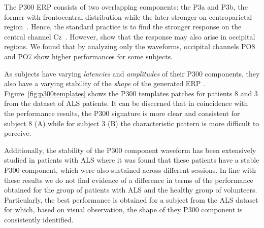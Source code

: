 \documentclass[utf8]{frontiersSCNS} %
\providecommand{\DIFaddtex}[1]{{\protect\color{blue}\uwave{#1}}} %
\providecommand{\DIFaddbegin}{} %
\providecommand{\DIFaddend}{} %
\providecommand{\DIFadd}[1]{\texorpdfstring{\DIFaddtex{#1}}{#1}} %
\begin{document}
\DIFaddend %

The P300 ERP  consists of two overlapping components: the P3a and P3b, the former with frontocentral distribution while the later stronger on centroparietal region~\citep{Polich2007}. Hence, the standard practice is to find the stronger response on the central channel Cz~\citep{Riccio2013}. However, \cite{Krusienski2006} show that the response may also arise in occipital regions.  We found that by analyzing only the waveforms, occipital channels PO8 and PO7 show higher performances for some subjects. 


As subjects have varying \textit{latencies} and \textit{amplitudes} of their P300 components, they also have a varying stability of the \textit{shape} of the generated ERP \citep{Nam2010}.  Figure~\ref{fig:p300templates} shows the \DIFaddbegin \DIFadd{ten sample }\DIFaddend P300 templates patches for patients 8 and 3 from the dataset of ALS patients. It can be discerned that in coincidence with the performance results, the P300 signature is more clear and consistent for subject 8 (A) while for subject 3 (B) the characteristic pattern is more difficult to perceive.

Additionally, the stability of the P300 component waveform has been extensively studied in patients with ALS \citep{SellersandEmanuelDonchin2006,TomohiroMadarame2008,Nijboer2009,Mak2012,McCane2015} where it was found that these patients have a stable P300 component, which were also sustained across different sessions.  In line with these results we do not find evidence of a difference in terms of the performance obtained for the group of patients with ALS and the healthy group of volunteers. Particularly, the best performance is obtained for a subject from the ALS dataset for which, based on visual observation, the shape of they P300 component is consistently identified.

\end{document}
